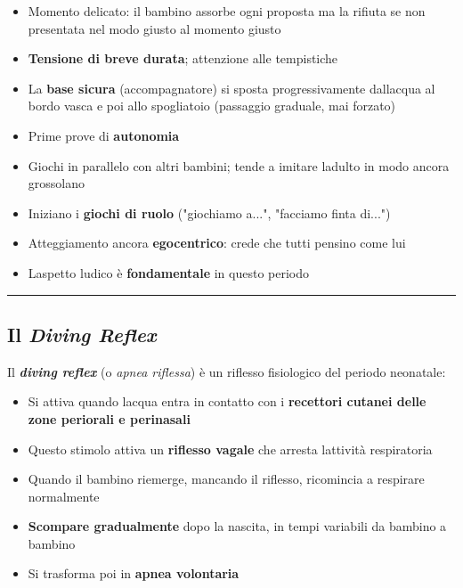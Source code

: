 \documentclass[a4paper,11pt]{article}
\providecommand{\tightlist}{%
  \setlength{\itemsep}{0pt}\setlength{\parskip}{0pt}}
\begin{document}
\begin{itemize}
      \tightlist
      \item
            Momento delicato: il bambino assorbe ogni proposta ma la rifiuta se
            non presentata nel modo giusto al momento giusto
      \item
            \textbf{Tensione di breve durata}; attenzione alle tempistiche
      \item
            La \textbf{base sicura} (accompagnatore) si sposta progressivamente
            dall\textquotesingle acqua al bordo vasca e poi allo spogliatoio
            (passaggio graduale, mai forzato)
      \item
            Prime prove di \textbf{autonomia}
      \item
            Giochi in parallelo con altri bambini; tende a imitare
            l\textquotesingle adulto in modo ancora grossolano
      \item
            Iniziano i \textbf{giochi di ruolo} ("giochiamo a...", "facciamo finta
            di...")
      \item
            Atteggiamento ancora \textbf{egocentrico}: crede che tutti pensino
            come lui
      \item
            L\textquotesingle aspetto ludico è \textbf{fondamentale} in questo
            periodo
\end{itemize}

\begin{center}\rule{0.5\linewidth}{0.5pt}\end{center}

\subsection{\texorpdfstring{Il \emph{Diving
                  Reflex}}{Il Diving Reflex}}\label{il-diving-reflex}

Il \textbf{\emph{diving reflex}} (o \emph{apnea riflessa}) è un riflesso
fisiologico del periodo neonatale:

\begin{itemize}
      \tightlist
      \item
            Si attiva quando l\textquotesingle acqua entra in contatto con i
            \textbf{recettori cutanei delle zone periorali e perinasali}
      \item
            Questo stimolo attiva un \textbf{riflesso vagale} che arresta
            l\textquotesingle attività respiratoria
      \item
            Quando il bambino riemerge, mancando il riflesso, ricomincia a
            respirare normalmente
      \item
            \textbf{Scompare gradualmente} dopo la nascita, in tempi variabili da
            bambino a bambino
      \item
            Si trasforma poi in \textbf{apnea volontaria}
\end{itemize}
\end{document}
